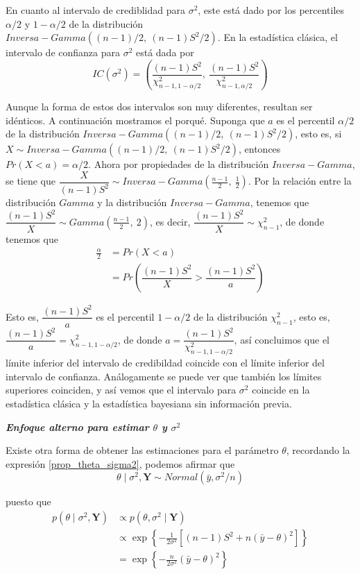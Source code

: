 \documentclass[10pt,openright]{book}\usepackage[]{graphicx}\usepackage[]{color}
\begin{document}
En cuanto al intervalo de crediblidad para $\sigma^2$, este est\'a dado por los percentiles $\alpha/2$ y $1-\alpha/2$ de la distribuci\'on $Inversa-Gamma((n-1)/2,\ (n-1)S^2/2)$. En la estad\'istica cl\'asica, el intervalo de confianza para $\sigma^2$ est\'a dada por \begin{equation*}
IC(\sigma^2)=\left(\dfrac{(n-1)S^2}{\chi^2_{n-1,1-\alpha/2}},\ \dfrac{(n-1)S^2}{\chi^2_{n-1,\alpha/2}}\right)
\end{equation*}

Aunque la forma de estos dos intervalos son muy diferentes, resultan ser id\'enticos. A continuaci\'on mostramos el porqu\'e. Suponga que $a$ es el percentil $\alpha/2$ de la distribuci\'on $Inversa-Gamma((n-1)/2,\ (n-1)S^2/2)$, esto es, si $X\sim Inversa-Gamma((n-1)/2,\ (n-1)S^2/2)$, entonces $Pr(X<a)=\alpha/2$. Ahora por propiedades de la distribuci\'on $Inversa-Gamma$, se tiene que $\dfrac{X}{(n-1)S^2}\sim Inversa-Gamma(\frac{n-1}{2},\ \frac{1}{2})$. Por la relaci\'on entre la distribuci\'on $Gamma$ y la distribuci\'on $Inversa-Gamma$, tenemos que $\dfrac{(n-1)S^2}{X}\sim Gamma(\frac{n-1}{2},\ 2)$, es decir, $\dfrac{(n-1)S^2}{X}\sim\chi^2_{n-1}$, de donde tenemos que
\begin{align*}
\frac{\alpha}{2}&=Pr(X<a)\\
&=Pr\left(\dfrac{(n-1)S^2}{X}>\dfrac{(n-1)S^2}{a}\right)
\end{align*}

Esto es, $\dfrac{(n-1)S^2}{a}$ es el percentil $1-\alpha/2$ de la distribuci\'on $\chi^2_{n-1}$, esto es,  $\dfrac{(n-1)S^2}{a}=\chi^2_{n-1,1-\alpha/2}$, de donde $a=\dfrac{(n-1)S^2}{\chi^2_{n-1,1-\alpha/2}}$, as\'i concluimos que el l\'imite inferior del intervalo de credibildad coincide con el l\'imite inferior del intervalo de confianza. An\'alogamente se puede ver que tambi\'en los l\'imites superiores coinciden, y as\'i vemos que el intervalo para $\sigma^2$ coincide en la estad\'istica cl\'asica y la estad\'istica bayesiana sin informaci\'on previa.

\textbf{\emph{Enfoque alterno para estimar $\theta$ y $\sigma^2$}}

Existe otra forma de obtener las estimaciones para el par\'ametro $\theta$, recordando la expresi\'on \ref{prop_theta_sigma2}, podemos afirmar que 
\begin{equation*}
\theta \mid \sigma^2, \mathbf{Y} \sim Normal(\bar{y},\sigma^2/n)
\end{equation*}

puesto que 
\begin{align*}
p(\theta \mid \sigma^2,\mathbf{Y})&\propto p(\theta, \sigma^2 \mid\mathbf{Y})\\
&\propto\exp\left\{-\frac{1}{2\sigma^2}\left[(n-1)S^2+n(\bar{y}-\theta)^2\right]\right\}\\
&=\exp\left\{-\frac{n}{2\sigma^2}(\bar{y}-\theta)^2\right\}
\end{align*}
\end{document}
